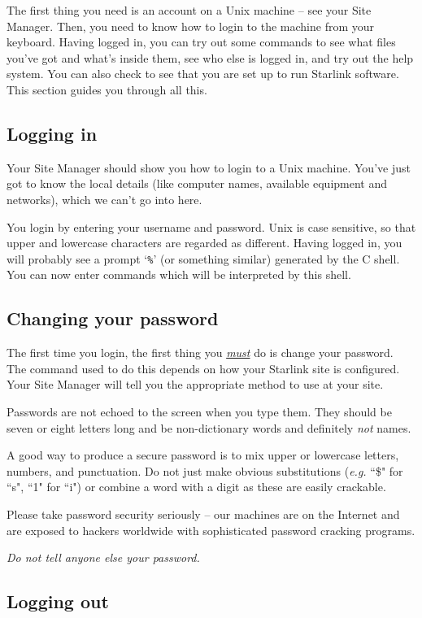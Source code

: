 \documentclass[twoside,11pt]{article}
\begin{document}
The first thing you need is an account on a Unix machine -- see your Site
Manager.
Then, you need to know how to login to the machine from your keyboard.
Having logged in, you can try out some commands to see what files you've got
and what's inside them, see who else is logged in, and try out the help system.
You can also check to see that you are set up to run Starlink software.
This section guides you through all this.

\subsection{Logging in}

Your Site Manager should show you how to login to a Unix machine.
You've just got to know the local details (like computer names, available
equipment and networks), which we can't go into here.

You login by entering your username and password.
Unix is case sensitive, so that upper and lowercase characters are
regarded as different.
Having logged in, you will probably see a prompt `{\tt \%}' (or something
similar) generated by the
C shell.
You can now enter commands which will
be interpreted by this shell.

\subsection{Changing your password}

The first time you login, the first thing you \underline{\em must\/} do
is change your password.
The command used to do this depends on how your Starlink site
is configured.
Your Site Manager will tell you the appropriate method to use at your site.

Passwords are not echoed to the screen when you type them.
They should be seven or eight letters long and
be non-dictionary words and definitely {\em not}\/ names.

A good way to produce a secure password is to mix upper or lowercase
letters, numbers, and punctuation. Do not just make obvious substitutions
({\em e.g.}\/ ``\$" for ``s", ``1" for ``i") or combine a word with a digit
as these are easily crackable.

Please take password security seriously -- our machines are on the
Internet and are exposed to hackers worldwide with sophisticated
password cracking programs.

{\em Do not tell anyone else your password.}

\subsection{Logging out}
\end{document}
